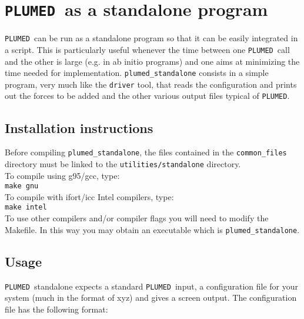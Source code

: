 \documentclass[12pt,fleqn]{report}
\newcommand{\plumed}{{\tt PLUMED}}
\begin{document}
\section{\plumed \ as a standalone program}


\plumed\ can be run as a standalone program so that it can be easily integrated in a script. This is particularly
useful whenever the time between one \plumed \ call and the other is large (e.g. in ab initio programs) and one
aims at minimizing the time needed for implementation. {\tt plumed\_standalone} consists in a simple program, very much like
the  {\tt driver} tool, that reads the configuration and prints out the forces to be added and the other various output files 
typical of \plumed.  

\subsection{Installation instructions}
Before compiling {\tt plumed\_standalone}, the files
contained in the {\tt common\_files} directory must be linked to the
{\tt utilities/standalone} directory. 
\vspace{10pt}\\
To compile using g95/gcc, type:
\vspace {10pt} \\
{\tt make gnu}
\vspace {10pt}\\

To compile with ifort/icc Intel compilers, type:
\vspace {10pt}\\
{\tt make intel}
\vspace {10pt}\\

To use other compilers and/or compiler flags you will need to modify the Makefile.
In this way you may obtain an executable which is {\tt plumed\_standalone}.


\subsection{Usage}

\plumed\ standalone expects a standard \plumed\ input, a configuration file for your system (much in the format of 
xyz) and gives a screen output.
The configuration file has the following format:
 
\end{document}
